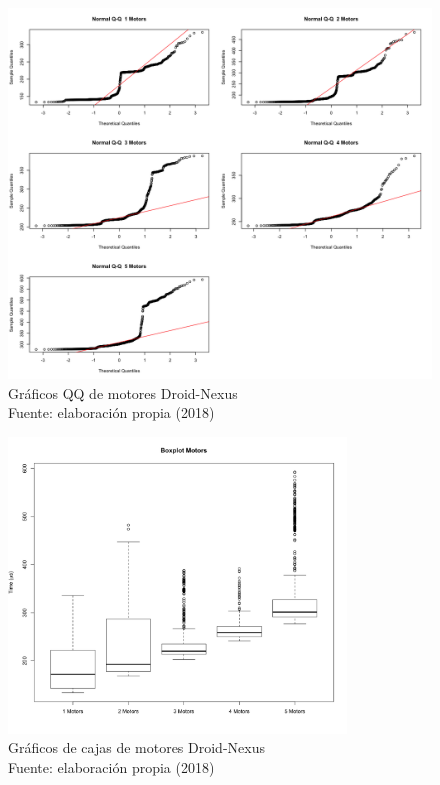 \begin{figure}[H]
  \begin{center} 
   	\includegraphics[width=1.0\textwidth]{evaluation/graphics/Droid/Nexus/NormalQQMotorsDroidNexus.png} 
    \caption[Gráfico QQ de motores Droid-Nexus]{Gráficos QQ de motores Droid-Nexus\\Fuente: elaboración propia (2018)} 
    \label{fig:droid-nexus-QQ-motors}
  \end{center}
\end{figure}

\begin{figure}[H]
  \begin{center} 
   	\includegraphics[width=0.8\textwidth]{evaluation/graphics/Droid/Nexus/BoxplotMotorsDroidNexus.png} 
    \caption[Gráficos de cajas de motores Droid-Nexus]{Gráficos de cajas de motores Droid-Nexus\\Fuente: elaboración propia (2018)} 
    \label{fig:droid-nexus-boxplot-motors}
  \end{center}
\end{figure}


